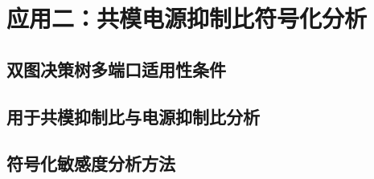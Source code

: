 \chapter{应用二：共模电源抑制比符号化分析}
\label{chap:cmps}

\section{双图决策树多端口适用性条件}
\label{sec:cmps:gpddtheory}

\section{用于共模抑制比与电源抑制比分析}
\label{sec:cmps:analysis}

\section{符号化敏感度分析方法}
\label{sec:cmps:analysis}